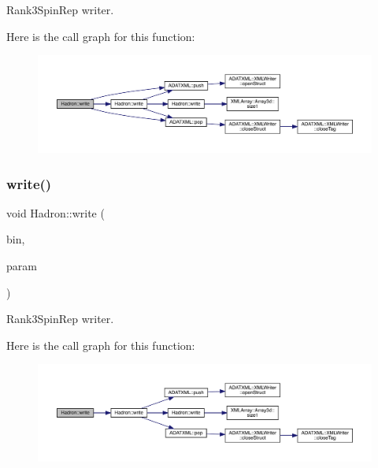 Rank3\+Spin\+Rep writer. 

Here is the call graph for this function\+:\nopagebreak
\begin{figure}[H]
\begin{center}
\leavevmode
\includegraphics[width=350pt]{d1/daf/namespaceHadron_a4286761aeb6d750c12bfba02d54b2b12_cgraph}
\end{center}
\end{figure}
\mbox{\label{namespaceHadron_ae2b761452803d14604c4471a4cf35ca3}} 
\subsubsection{\texorpdfstring{write()}{write()}\hspace{0.1cm}{\footnotesize\ttfamily [86/95]}}
{\footnotesize\ttfamily void Hadron\+::write (\begin{DoxyParamCaption}\item[{\mbox{\hyperlink{classADATIO_1_1BinaryWriter}{Binary\+Writer}} \&}]{bin,  }\item[{const \mbox{\hyperlink{structHadron_1_1Rank3SpinRep__t}{Rank3\+Spin\+Rep\+\_\+t}} \&}]{param }\end{DoxyParamCaption})}



Rank3\+Spin\+Rep writer. 

Here is the call graph for this function\+:\nopagebreak
\begin{figure}[H]
\begin{center}
\leavevmode
\includegraphics[width=350pt]{d1/daf/namespaceHadron_ae2b761452803d14604c4471a4cf35ca3_cgraph}
\end{center}
\end{figure}
\mbox{\label{namespaceHadron_a2e0c9a892aa8790addf90c28db1eaf28}} 
